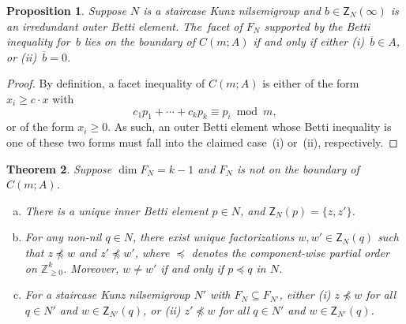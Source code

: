 \documentclass[10pt,a4paper]{amsart}
\newcommand\ZZ{\mathbb{Z}}
\newtheorem{thm}{Theorem}[section]
\newtheorem{prop}[thm]{Proposition}
\theoremstyle{definition}\newtheorem{defi}[thm]{Definition}
\begin{document}
\begin{prop}\label{p:fanboundary}
Suppose $N$ is a staircase Kunz nilsemigroup and $b \in \mathsf Z_N(\infty)$ is an irredundant outer Betti element.  The~facet of $F_N$ supported by the Betti inequality for~$b$ lies on the boundary of $C(m;A)$ if and only if either (i)~$\overline b \in A$, or (ii)~$\overline b = 0$.  
\end{prop}

\begin{proof}
By definition, a facet inequality of $C(m;A)$ is either of the form $x_i \ge c \cdot x$ with 
$$c_1p_1 + \cdots + c_kp_k \equiv p_i \bmod m,$$
or of the form $x_i \ge 0$.  As such, an outer Betti element whose Betti inequality is one of these two forms must fall into the claimed case~(i) or~(ii), respectively.  
\end{proof}

\setcounter{thm}{4}
\begin{thm}\label{t:cutandpaste}
Suppose $\dim F_N = k - 1$ and $F_N$ is not on the boundary of $C(m;A)$.  
\begin{enumerate}[(a)]
\item 
There is a unique inner Betti element $p \in N$, and $\mathsf Z_N(p) = \{z, z'\}$.  

\item 
For any non-nil $q \in N$, there exist unique factorizations $w, w' \in \mathsf Z_N(q)$ such that $z \not\preceq w$ and $z' \not\preceq w'$, where $\preceq$ denotes the component-wise partial order on $\ZZ_{\ge 0}^k$.  Moreover, $w \ne w'$ if and only if $p \preceq q$ in $N$.  

\item 
For a staircase Kunz nilsemigroup $N'$ with $F_N \subseteq F_{N'}$, either (i) $z \not\preceq w$ for all $q \in N'$ and $w \in \mathsf Z_{N'}(q)$, or (ii) $z' \not\preceq w$ for all $q \in N'$ and $w \in \mathsf Z_{N'}(q)$.  

\end{enumerate}
\end{thm}
\end{document}
